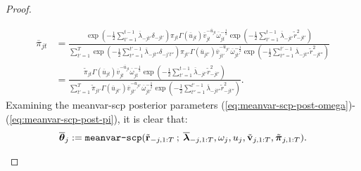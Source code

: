 \begin{proof}
\begin{enumerate}[label=\roman*.]
\begin{align*}
    \overline{\pi}_{jt}  &= \frac{\exp\left(-\frac{1}{2}\sum_{t'=1}^{t-1}\overline{\lambda}_{-jt'}\delta_{-jt'}\right)\pi_{jt}\Gamma(\overline{u}_{jt})\overline{v}_{jt}^{-\overline{u}_{jt}}\overline{\omega}_{jt}^{-\frac{1}{2}}\exp\left( -\frac{1}{2} \sum_{t'=1}^{t-1} \overline{\lambda}_{-jt'}\tilde{r}_{-jt'}^2 \right)}{\sum_{t'=1}^T \exp\left(-\frac{1}{2}\sum_{t''=1}^{t'-1}\overline{\lambda}_{-jt''}\delta_{-j't''}\right) \pi_{jt'}\Gamma(\overline{u}_{jt'})\overline{v}_{jt'}^{-\overline{u}_{jt'}}\overline{\omega}_{jt'}^{-\frac{1}{2}}\exp\left( -\frac{1}{2} \sum_{t''=1}^{t'-1} \overline{\lambda}_{-jt''}\tilde{r}_{-jt''}^2\right)} \\
    &= \frac{\tilde{\pi}_{jt}\Gamma(\overline{u}_{jt})\overline{v}_{jt}^{-\overline{u}_{jt}}\overline{\omega}_{jt}^{-\frac{1}{2}}\exp\left( -\frac{1}{2} \sum_{t'=1}^{t-1} \overline{\lambda}_{-jt'}\tilde{r}_{-jt'}^2 \right)}{\sum_{t'=1}^T \tilde{\pi}_{jt'}\Gamma(\overline{u}_{jt'})\overline{v}_{jt'}^{-\overline{u}_{jt'}}\overline{\omega}_{jt'}^{-\frac{1}{2}}\exp\left( -\frac{1}{2} \sum_{t''=1}^{t'-1} \overline{\lambda}_{-jt''}\tilde{r}_{-jt''}^2\right)}.
\end{align*}
Examining the meanvar-scp posterior parameters (\ref{eq:meanvar-scp-post-omega})-(\ref{eq:meanvar-scp-post-pi}), it is clear that:
\begin{align*}
    \overline{\boldsymbol{\theta}}_j := \normalfont{\texttt{meanvar-scp}}(\tilde{\mathbf{r}}_{-j,1:T} \:;\:\overline{\boldsymbol{\lambda}}_{-j,1:T}, \omega_j, u_j, \tilde{\mathbf{v}}_{j,1:T}, \tilde{\boldsymbol{\pi}}_{j,1:T}).
\end{align*}

\end{enumerate}
\end{proof}